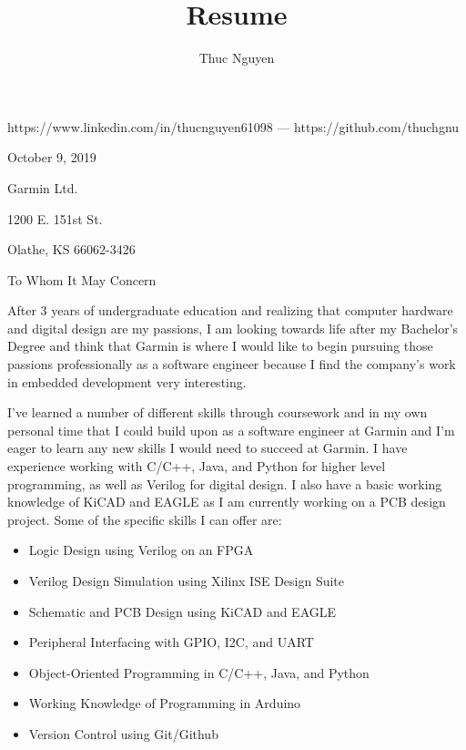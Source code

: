 \documentclass{article}
\renewcommand{\maketitle}
{\begin{center}
{\huge\bfseries\theauthor}
\vspace{.5em}

https://www.linkedin.com/in/thucnguyen61098 --- https://github.com/thuchgnu

\end{center}}
\begin{document}
\title{Resume}
\author{Thuc Nguyen}
\maketitle
\vspace{-.5em}

\begin{flushleft}
\vspace{1.6em}

October 9, 2019

\vspace{1.6em}

Garmin Ltd.

1200 E. 151st St.

Olathe, KS 66062-3426

\end{flushleft}
\vspace{1.6em}
To Whom It May Concern

\vspace{1em}
After 3 years of undergraduate education and realizing that computer hardware and digital design are my passions, I am looking towards life after my Bachelor's Degree and think that Garmin is where I would like to begin pursuing those passions professionally as a software engineer because I find the company's work in embedded development very interesting.

\vspace{.6em}
I've learned a number of different skills through coursework and in my own personal time that I could build upon as a software engineer at Garmin and I'm eager to learn any new skills I would need to succeed at Garmin. I have experience working with C/C++, Java, and Python for higher level programming, as well as Verilog for digital design. I also have a basic working knowledge of KiCAD and EAGLE as I am currently working on a PCB design project. Some of the specific skills I can offer are:

\begin{itemize}
  \item{Logic Design using Verilog on an FPGA}
  \item{Verilog Design Simulation using Xilinx ISE Design Suite}
  \item{Schematic and PCB Design using KiCAD and EAGLE}
  \item{Peripheral Interfacing with GPIO, I2C, and UART}
  \item{Object-Oriented Programming in C/C++, Java, and Python}
  \item{Working Knowledge of Programming in Arduino}
  \item{Version Control using Git/Github}
\end{itemize}
\end{document}
